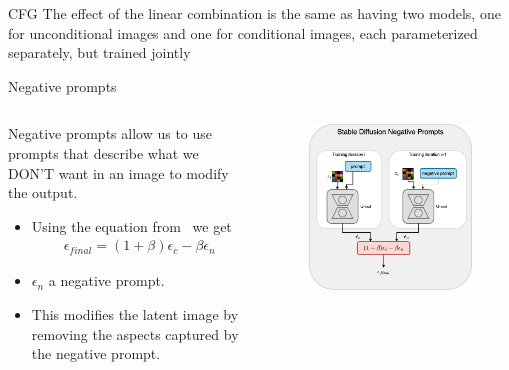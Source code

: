 \documentclass[8pt]{beamer}
\begin{document}
\begin{frame}{CFG}
    The effect of the linear combination is the same as having two models, one for unconditional images and one for conditional images, each parameterized separately, but trained jointly
\end{frame}



\begin{frame}{Negative prompts}
    \fontsize{7pt}{7pt}\selectfont
    \begin{columns}
        \begin{column}{.5\textwidth}
            Negative prompts allow us to use prompts that describe what we DON'T want in an image to modify the output.
            \begin{itemize}
                \item Using the equation from~\cite{ho2022classifierfree} we get
                \begin{align*}
                    \epsilon_{final} = (1 + \beta)\epsilon_{c} - \beta \epsilon_{n}
                \end{align*}
                \item $\epsilon_{n}$ a negative prompt.
                \item This modifies the latent image by removing the aspects captured by the negative prompt.
            \end{itemize}
        \end{column}
        \begin{column}{.5\textwidth}
           \begin{figure}
               \includegraphics[scale=0.23]{images/sd_negative_prompts}
               \label{fig:sd_negative_prompts}
           \end{figure}
        \end{column}
    \end{columns}
\end{frame}
\end{document}
